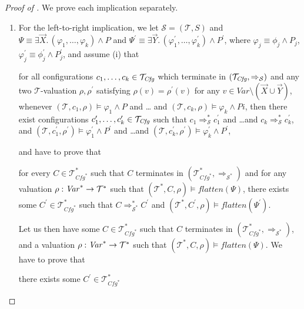 \begin{proof}[Proof of ]
We prove each implication separately.
\begin{enumerate}
    \item For the left-to-right implication, we
    let $\mathcal{S} = (\mathcal{T}, S)$
    and $\Psi \equiv  \exists \vec{X}.\, (\varphi_1,\ldots,\varphi_k) \land P$
    and $\Psi^\prime \equiv \exists \vec{Y}.\, (\varphi_1^\prime,\ldots,\varphi_k^\prime) \land P^\prime$,
    where $\varphi_j \equiv \phi_j \land P_j$,
    $\varphi^\prime_j \equiv \phi^\prime_j \land P^\prime_j$,
    and assume (i) that
    \begin{proofenv}
        for all configurations $c_1,\ldots,c_k \in \mathcal{T}_{\mathit{Cfg}}$
    which terminate in $(\mathcal{T}_{\mathit{Cfg}}, \Rightarrow_{\mathcal{S}})$
    and any two $\mathcal{T}$-valuation $\rho,\rho^\prime$
    satisfying $\rho(v) = \rho^\prime(v)$ for any $v \in \mathit{Var} \setminus (\vec{X} \cup \vec{Y})$,
    whenever $(\mathcal{T}, c_1,\rho) \vDash \varphi_1 \land P$ and \ldots
    and $(\mathcal{T}, c_k,\rho) \vDash \varphi_k \land Pi$,
    then there exist configurations $c_1^\prime,\ldots,c_k^\prime \in \mathcal{T}_{\mathit{Cfg}}$
    such that $c_1 \Rightarrow^{*}_{\mathcal{S}} c_1^\prime$  
    and \ldots and $c_k \Rightarrow^{*}_{\mathcal{S}} c_k^\prime$,
    and
    $(\mathcal{T}, c_1^\prime,\rho^\prime) \vDash \varphi_1^\prime \land P^\prime$ and \ldots and $(\mathcal{T}, c_k^\prime, \rho^\prime) \vDash \varphi_k^\prime \land P^\prime$,
    \end{proofenv}
    and have to prove that
    \begin{proofenv}
    for every $C \in \mathcal{T}^*_{\mathit{Cfg}^*}$
    such that $C$ terminates in $(\mathcal{T}^*_{\mathit{Cfg}^*}, \Rightarrow_{\mathcal{S}^*})$
    and for any valuation $\rho : \mathit{Var}^* \to \mathcal{T}^*$
    such that $(\mathcal{T}^*, C, \rho) \vDash \mathit{flatten}(\Psi)$,
    there exists some $C^\prime \in \mathcal{T}^*_{\mathit{Cfg}^*}$
    such that
    $C \Rightarrow^{*}_{\mathcal{S}^*} C^\prime$
    and $(\mathcal{T}^*, C^\prime, \rho) \vDash \mathit{flatten}(\Psi^\prime)$.
    \end{proofenv}
    Let us then have some $C \in \mathcal{T}^*_{\mathit{Cfg}^*}$
    such that $C$ terminates in $(\mathcal{T}^*_{\mathit{Cfg}^*}, \Rightarrow_{\mathcal{S}^*})$,
    and a valuation $\rho : \mathit{Var}^* \to \mathcal{T}^*$
    such that $(\mathcal{T}^*, C, \rho) \vDash \mathit{flatten}(\Psi)$.
    We have to prove that
    \begin{proofenv}
    there exists some $C^\prime \in \mathcal{T}^*_{\mathit{Cfg}^*}$

\end{proofenv}
\end{enumerate}
\end{proof}
